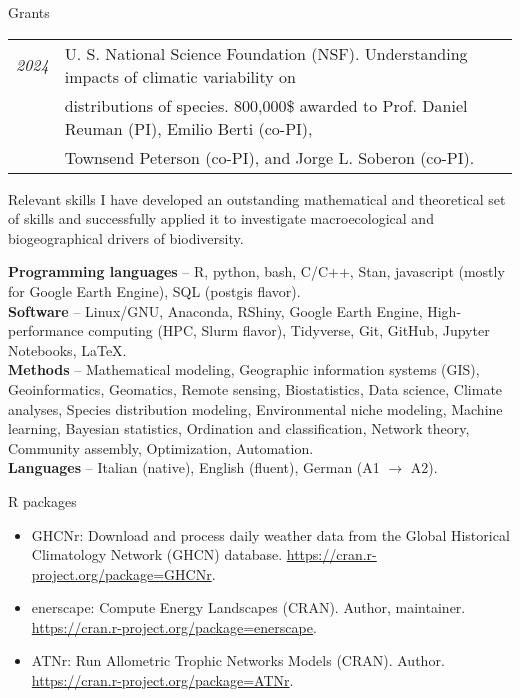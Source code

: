 \documentclass{resume} %
\begin{document}
\begin{rSection}{Grants}
\begin{tabular}{l l}
{\em 2024} & U. S. National Science Foundation (NSF). Understanding impacts of climatic variability on\\
           & distributions of species. 800,000\$ awarded to Prof. Daniel Reuman (PI), Emilio Berti (co-PI),\\
           & Townsend Peterson (co-PI), and Jorge L. Soberon (co-PI).
\end{tabular}
\end{rSection}

\begin{rSection}{Relevant skills}
I have developed an outstanding mathematical and theoretical set of skills and successfully applied it to
investigate macroecological and biogeographical drivers of biodiversity.

\textbf{Programming languages} – R, python, bash, C/C++, Stan, javascript (mostly for Google Earth Engine), SQL (postgis flavor).\\
\textbf{Software} – Linux/GNU, Anaconda, RShiny, Google Earth Engine, High-performance computing (HPC, Slurm flavor), Tidyverse, Git, GitHub, Jupyter Notebooks, \LaTeX.\\
\textbf{Methods} – Mathematical modeling, Geographic information systems (GIS), Geoinformatics, Geomatics, Remote sensing, Biostatistics, Data science, Climate analyses, Species distribution modeling, Environmental niche modeling, Machine learning, Bayesian statistics, Ordination and classification, Network theory,
Community assembly, Optimization, Automation.\\
\textbf{Languages} – Italian (native), English (fluent), German (A1 $\rightarrow$ A2).
\end{rSection}

\begin{rSection}{R packages}
\begin{itemize}
    \setlength\itemsep{-0.5em}
    \item GHCNr: Download and process daily weather data from the Global Historical Climatology Network (GHCN) database. \url{https://cran.r-project.org/package=GHCNr}.
    \item enerscape: Compute Energy Landscapes (CRAN). Author, maintainer. \url{https://cran.r-project.org/package=enerscape}.
    \item ATNr: Run Allometric Trophic Networks Models (CRAN). Author. \url{https://cran.r-project.org/package=ATNr}.
\end{itemize}
\end{rSection}
\end{document}
